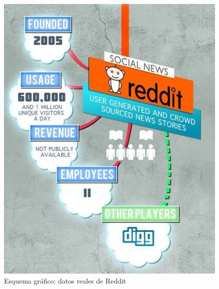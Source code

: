 ~

\begin{figure}[!h]
    \begin{center}
          \includegraphics[scale=0.4]{imagenes/im_2.jpg}
          \caption{Esquema gráfico: datos reales de Reddit}
          \label{fig:contra1}
    \end{center}
\end{figure}
\FloatBarrier
